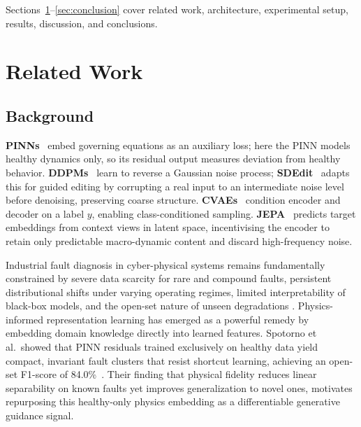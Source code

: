 \documentclass[conference]{IEEEtran}
\begin{document}
Sections~\ref{sec:related}--\ref{sec:conclusion} cover related work, architecture, experimental setup, results, discussion, and conclusions.

\section{Related Work}
\label{sec:related}

\subsection{Background}
\label{subsec:background}
\textbf{PINNs}~\cite{raissi2019physics} embed governing equations as an auxiliary loss; here the PINN models healthy dynamics only, so its residual output measures deviation from healthy behavior. \textbf{DDPMs}~\cite{ho2020denoising} learn to reverse a Gaussian noise process; \textbf{SDEdit}~\cite{sdedit2021} adapts this for guided editing by corrupting a real input to an intermediate noise level before denoising, preserving coarse structure. \textbf{CVAEs}~\cite{sohn2015cvae} condition encoder and decoder on a label $y$, enabling class-conditioned sampling. \textbf{JEPA}~\cite{jepa2024} predicts target embeddings from context views in latent space, incentivising the encoder to retain only predictable macro-dynamic content and discard high-frequency noise.
 
Industrial fault diagnosis in cyber-physical systems remains fundamentally constrained by severe data scarcity for rare and compound faults, persistent distributional shifts under varying operating regimes, limited interpretability of black-box models, and the open-set nature of unseen degradations \cite{huang2023compound}. Physics-informed representation learning has emerged as a powerful remedy by embedding domain knowledge directly into learned features. Spotorno et al.\ showed that PINN residuals trained exclusively on healthy data yield compact, invariant fault clusters that resist shortcut learning, achieving an open-set F1-score of 84.0\%~\cite{spotorno2026linking}. Their finding that physical fidelity reduces linear separability on known faults yet improves generalization to novel ones, motivates repurposing this healthy-only physics embedding as a differentiable generative guidance signal.
 
\end{document}
